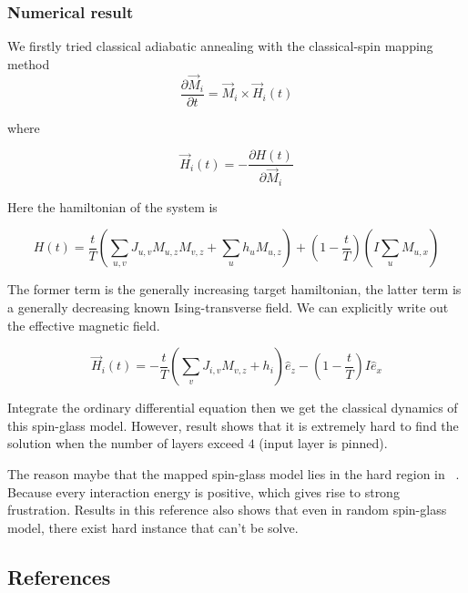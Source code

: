 \documentclass[twocolumn,superscriptaddress,english,showpacs,longbibliography]{revtex4-2}
\begin{document}
\subsubsection{Numerical result}\label{numerical-result-1}

We firstly tried classical adiabatic annealing with the classical-spin
mapping method~\cite{Wang2013}
\begin{equation}
\frac{\partial \vec M_i}{\partial t} = \vec M_{i} \times \vec H_{i}(t)
\end{equation}

where

\begin{equation}
\vec H_i(t) = -\frac{\partial H(t)}{\partial \vec M_i} 
\end{equation}

Here the hamiltonian of the system is

\begin{equation}
H(t) = \frac{t}{T}(\sum_{u,v}J_{u,v} M_{u,z}M_{v,z} + \sum_{u} h_u M_{u, z}) + (1-\frac{t}{T})(I\sum_{u}M_{u,x})
\end{equation}

The former term is the generally increasing target hamiltonian, the
latter term is a generally decreasing known Ising-transverse field. We
can explicitly write out the effective magnetic field.

\[
\vec H_{i}(t) = -\frac{t}{T}(\sum_{v}J_{i, v}M_{v,z} + h_i)\hat e_z - (1-\frac{t}{T})I\hat e_x
\]

Integrate the ordinary differential equation then we get the classical
dynamics of this spin-glass model. However, result shows that it is
extremely hard to find the solution when the number of layers exceed
$4$ (input layer is pinned).

The reason maybe that the mapped spin-glass model lies in the hard
region in ~\cite{Wang2013}. Because every interaction energy is positive, which
gives rise to strong frustration. Results in this reference also shows that even in
random spin-glass model, there exist hard instance that can't be solve.

\subsection{References}\label{references}
\end{document}
